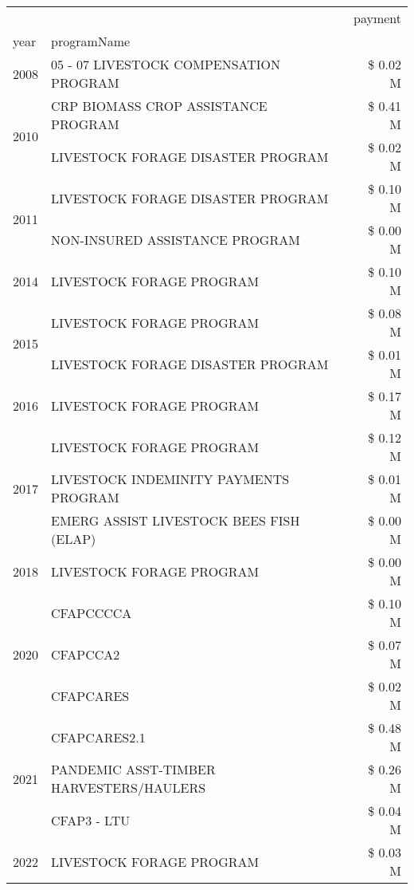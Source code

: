 \begin{tabular}{llr}
\toprule
 &  & payment \\
year & programName &  \\
\midrule
2008 & 05 - 07 LIVESTOCK COMPENSATION PROGRAM & \$ 0.02 M \\
\cline{1-3}
\multirow[t]{2}{*}{2010} & CRP BIOMASS CROP ASSISTANCE PROGRAM & \$ 0.41 M \\
 & LIVESTOCK FORAGE DISASTER PROGRAM & \$ 0.02 M \\
\cline{1-3}
\multirow[t]{2}{*}{2011} & LIVESTOCK FORAGE DISASTER PROGRAM & \$ 0.10 M \\
 & NON-INSURED ASSISTANCE PROGRAM & \$ 0.00 M \\
\cline{1-3}
2014 & LIVESTOCK FORAGE PROGRAM & \$ 0.10 M \\
\cline{1-3}
\multirow[t]{2}{*}{2015} & LIVESTOCK FORAGE PROGRAM & \$ 0.08 M \\
 & LIVESTOCK FORAGE DISASTER PROGRAM & \$ 0.01 M \\
\cline{1-3}
2016 & LIVESTOCK FORAGE PROGRAM & \$ 0.17 M \\
\cline{1-3}
\multirow[t]{3}{*}{2017} & LIVESTOCK FORAGE PROGRAM & \$ 0.12 M \\
 & LIVESTOCK INDEMINITY PAYMENTS PROGRAM & \$ 0.01 M \\
 & EMERG ASSIST LIVESTOCK BEES FISH (ELAP) & \$ 0.00 M \\
\cline{1-3}
2018 & LIVESTOCK FORAGE PROGRAM & \$ 0.00 M \\
\cline{1-3}
\multirow[t]{3}{*}{2020} & CFAPCCCCA & \$ 0.10 M \\
 & CFAPCCA2 & \$ 0.07 M \\
 & CFAPCARES & \$ 0.02 M \\
\cline{1-3}
\multirow[t]{3}{*}{2021} & CFAPCARES2.1 & \$ 0.48 M \\
 & PANDEMIC ASST-TIMBER HARVESTERS/HAULERS & \$ 0.26 M \\
 & CFAP3 - LTU & \$ 0.04 M \\
\cline{1-3}
2022 & LIVESTOCK FORAGE PROGRAM & \$ 0.03 M \\
\cline{1-3}
\bottomrule
\end{tabular}
